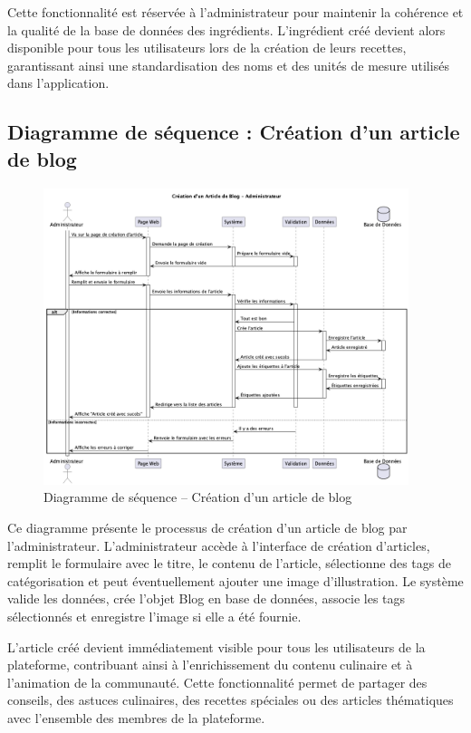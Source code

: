 \documentclass[12pt,a4paper]{report}
\begin{document}
Cette fonctionnalité est réservée à l'administrateur pour maintenir la cohérence et la qualité de la base de données des ingrédients. L'ingrédient créé devient alors disponible pour tous les utilisateurs lors de la création de leurs recettes, garantissant ainsi une standardisation des noms et des unités de mesure utilisés dans l'application.

\subsection{Diagramme de séquence : Création d'un article de blog}

\begin{figure}[H]
    \centering
    \includegraphics[width=0.95\textwidth]{sequence_diagram_creation_blog.png}
    \caption{Diagramme de séquence – Création d'un article de blog}
    \label{fig:sequence_creation_blog}
\end{figure}

Ce diagramme présente le processus de création d'un article de blog par l'administrateur. L'administrateur accède à l'interface de création d'articles, remplit le formulaire avec le titre, le contenu de l'article, sélectionne des tags de catégorisation et peut éventuellement ajouter une image d'illustration. Le système valide les données, crée l'objet Blog en base de données, associe les tags sélectionnés et enregistre l'image si elle a été fournie.

L'article créé devient immédiatement visible pour tous les utilisateurs de la plateforme, contribuant ainsi à l'enrichissement du contenu culinaire et à l'animation de la communauté. Cette fonctionnalité permet de partager des conseils, des astuces culinaires, des recettes spéciales ou des articles thématiques avec l'ensemble des membres de la plateforme.
\end{document}

